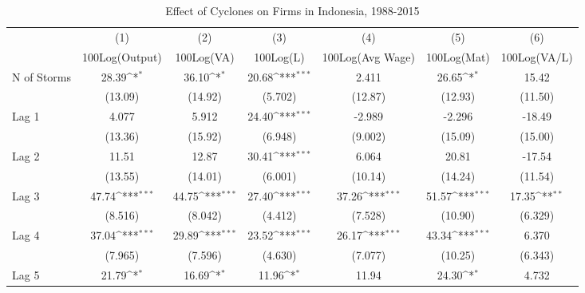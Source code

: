 \begin{table}[htbp]\centering
\def\sym#1{\ifmmode^{#1}\else\(^{#1}\)\fi}
\caption{Effect of Cyclones on Firms in Indonesia, 1988-2015}
\begin{tabular}{l*{6}{c}}
\toprule
                &\multicolumn{1}{c}{(1)}&\multicolumn{1}{c}{(2)}&\multicolumn{1}{c}{(3)}&\multicolumn{1}{c}{(4)}&\multicolumn{1}{c}{(5)}&\multicolumn{1}{c}{(6)}\\
                &\multicolumn{1}{c}{100Log(Output)}&\multicolumn{1}{c}{100Log(VA)}&\multicolumn{1}{c}{100Log(L)}&\multicolumn{1}{c}{100Log(Avg Wage)}&\multicolumn{1}{c}{100Log(Mat)}&\multicolumn{1}{c}{100Log(VA/L)}\\
\midrule
N of Storms     &    28.39\sym{*}  &    36.10\sym{*}  &    20.68\sym{***}&    2.411         &    26.65\sym{*}  &    15.42         \\
                &  (13.09)         &  (14.92)         &  (5.702)         &  (12.87)         &  (12.93)         &  (11.50)         \\
\addlinespace
Lag 1           &    4.077         &    5.912         &    24.40\sym{***}&   -2.989         &   -2.296         &   -18.49         \\
                &  (13.36)         &  (15.92)         &  (6.948)         &  (9.002)         &  (15.09)         &  (15.00)         \\
\addlinespace
Lag 2           &    11.51         &    12.87         &    30.41\sym{***}&    6.064         &    20.81         &   -17.54         \\
                &  (13.55)         &  (14.01)         &  (6.001)         &  (10.14)         &  (14.24)         &  (11.54)         \\
\addlinespace
Lag 3           &    47.74\sym{***}&    44.75\sym{***}&    27.40\sym{***}&    37.26\sym{***}&    51.57\sym{***}&    17.35\sym{**} \\
                &  (8.516)         &  (8.042)         &  (4.412)         &  (7.528)         &  (10.90)         &  (6.329)         \\
\addlinespace
Lag 4           &    37.04\sym{***}&    29.89\sym{***}&    23.52\sym{***}&    26.17\sym{***}&    43.34\sym{***}&    6.370         \\
                &  (7.965)         &  (7.596)         &  (4.630)         &  (7.077)         &  (10.25)         &  (6.343)         \\
\addlinespace
Lag 5           &    21.79\sym{*}  &    16.69\sym{*}  &    11.96\sym{*}  &    11.94         &    24.30\sym{*}  &    4.732         \\

\end{tabular}
\end{table}
